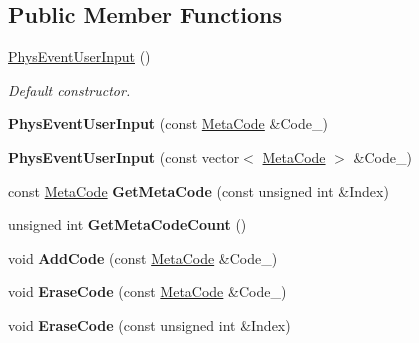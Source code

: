 \subsection*{Public Member Functions}
\begin{DoxyCompactItemize}
\item 
\hyperlink{classPhysEventUserInput_a6f8eaf698e8109d5cb30f2f17044f1ba}{PhysEventUserInput} ()
\begin{DoxyCompactList}\small\item\em Default constructor. \item\end{DoxyCompactList}\item 
\hypertarget{classPhysEventUserInput_ae13b1b02bfa3ef64dc4205478a68810f}{
{\bfseries PhysEventUserInput} (const \hyperlink{classMetaCode}{MetaCode} \&Code\_\-)}
\label{dc/d0e/classPhysEventUserInput_ae13b1b02bfa3ef64dc4205478a68810f}

\item 
\hypertarget{classPhysEventUserInput_a8b1c0e36d39075dffa4f88d10f2376d9}{
{\bfseries PhysEventUserInput} (const vector$<$ \hyperlink{classMetaCode}{MetaCode} $>$ \&Code\_\-)}
\label{dc/d0e/classPhysEventUserInput_a8b1c0e36d39075dffa4f88d10f2376d9}

\item 
\hypertarget{classPhysEventUserInput_aa564530c27f6983bb412e46c2c7ed086}{
const \hyperlink{classMetaCode}{MetaCode} {\bfseries GetMetaCode} (const unsigned int \&Index)}
\label{dc/d0e/classPhysEventUserInput_aa564530c27f6983bb412e46c2c7ed086}

\item 
\hypertarget{classPhysEventUserInput_a86df812a38566a572134100a422a8799}{
unsigned int {\bfseries GetMetaCodeCount} ()}
\label{dc/d0e/classPhysEventUserInput_a86df812a38566a572134100a422a8799}

\item 
\hypertarget{classPhysEventUserInput_a4f5b94c64cd08c15b480e441d25a385d}{
void {\bfseries AddCode} (const \hyperlink{classMetaCode}{MetaCode} \&Code\_\-)}
\label{dc/d0e/classPhysEventUserInput_a4f5b94c64cd08c15b480e441d25a385d}

\item 
\hypertarget{classPhysEventUserInput_a1dbd2996770df334fba9f67d9bb4ffa0}{
void {\bfseries EraseCode} (const \hyperlink{classMetaCode}{MetaCode} \&Code\_\-)}
\label{dc/d0e/classPhysEventUserInput_a1dbd2996770df334fba9f67d9bb4ffa0}

\item 
\hypertarget{classPhysEventUserInput_a8cbbee3c2be3bd12746ad442fce526e4}{
void {\bfseries EraseCode} (const unsigned int \&Index)}
\label{dc/d0e/classPhysEventUserInput_a8cbbee3c2be3bd12746ad442fce526e4}


\end{DoxyCompactItemize}
